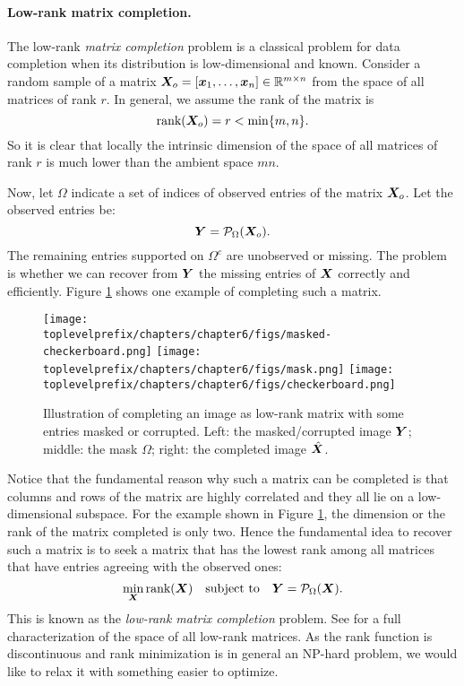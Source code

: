 \documentclass[../../book-main.tex]{subfiles}
\begin{document}
\paragraph{Low-rank matrix completion.}  
The low-rank {\em matrix
completion} problem is a classical problem for data completion when its distribution is low-dimensional and known. Consider a  random sample of a matrix $\bm{X}_o =
[\bm{x}_1, \ldots, \bm{x}_n] \in \mathbb{R}^{m\times n}$ from the space of all matrices of rank $r$. In general, we assume the rank
of the matrix is
\begin{equation}
\mbox{rank}(\bm{X}_o) = r < \min\{m, n\}.
\end{equation}
So it is clear that locally the intrinsic dimension of the space of all matrices of rank $r$ is much lower than the ambient space $mn$.

Now, let $\Omega$ indicate a set of indices of observed entries of the matrix $\bm{X}_o$. Let the observed entries be:
\begin{equation}
\bm{Y} = \mathcal{P}_{\Omega}(\bm{X}_o).
\end{equation}
The remaining entries supported on $\Omega^c$ are unobserved or
missing. The problem is whether we can recover from $\bm{Y}$ the missing
entries of $\bm{X}$ correctly and efficiently.  Figure \ref{fig:matrix-completion} shows one
example of completing such a matrix.

\begin{figure}
\centering
\texttt{[image: \\toplevelprefix/chapters/chapter6/figs/masked-checkerboard.png]}\;\;
\texttt{[image: \\toplevelprefix/chapters/chapter6/figs/mask.png]}\;\;
\texttt{[image: \\toplevelprefix/chapters/chapter6/figs/checkerboard.png]}
\caption{Illustration of  completing an image as low-rank matrix
  with some entries masked or corrupted. Left: the masked/corrupted
image $\bm{Y}$; middle: the mask $\Omega$; right: the completed image $\hat {\bm{X}}$.}
\label{fig:matrix-completion}
\end{figure}

Notice that the fundamental reason why such a matrix can be completed is that columns and rows of the matrix are highly correlated and
they all lie on a low-dimensional subspace. For the example shown in
Figure \ref{fig:matrix-completion}, the dimension or the rank of the matrix completed is only two. Hence the fundamental idea to recover such a matrix is to seek a matrix that has the lowest rank among all
matrices that have entries agreeing with the observed ones:
\begin{equation}
\min_{\bm{X}} \mbox{rank}(\bm{X}) \quad \mbox{subject to}
\quad
\bm{Y} = \mathcal{P}_{\Omega}(\bm{X}).
\label{eqn:rank-min}
\end{equation}
This is known as the {\em low-rank matrix completion} problem. See \cite{Wright-Ma-2022} for a full characterization of the space of all low-rank matrices. As the rank function is discontinuous and rank minimization
is in general an NP-hard problem, we would like to relax it with
something easier to optimize.
\end{document}

